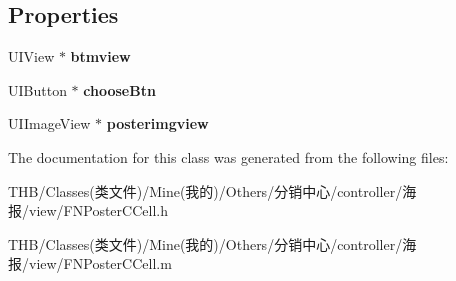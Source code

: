 \subsection*{Properties}
\begin{DoxyCompactItemize}
\item 
\mbox{\label{interface_f_n_poster_c_cell_a24145bfdd7f556c59e3d47faa164e4cb}} 
U\+I\+View $\ast$ {\bfseries btmview}
\item 
\mbox{\label{interface_f_n_poster_c_cell_a5d3d49b4532f31cfcc6edb6fa451b3d2}} 
U\+I\+Button $\ast$ {\bfseries choose\+Btn}
\item 
\mbox{\label{interface_f_n_poster_c_cell_a802afcc6882d86401dd4d949357f909e}} 
U\+I\+Image\+View $\ast$ {\bfseries posterimgview}
\end{DoxyCompactItemize}


The documentation for this class was generated from the following files\+:\begin{DoxyCompactItemize}
\item 
T\+H\+B/\+Classes(类文件)/\+Mine(我的)/\+Others/分销中心/controller/海报/view/F\+N\+Poster\+C\+Cell.\+h\item 
T\+H\+B/\+Classes(类文件)/\+Mine(我的)/\+Others/分销中心/controller/海报/view/F\+N\+Poster\+C\+Cell.\+m\end{DoxyCompactItemize}
